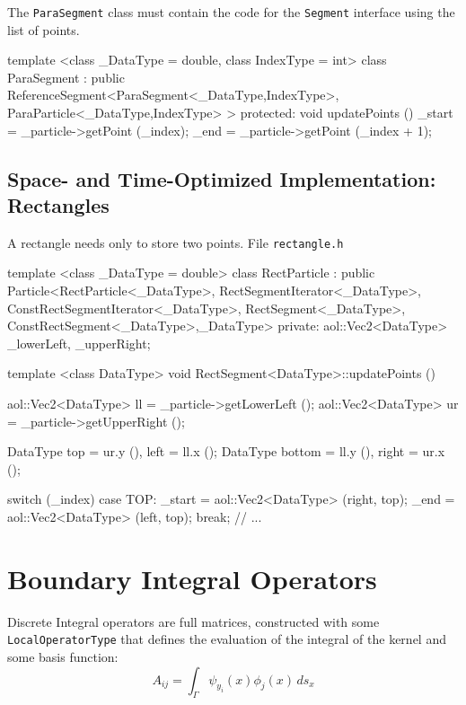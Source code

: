 The \lstinline$ParaSegment$ class must contain the code for the
\lstinline$Segment$ interface using the list of points.

\begin{myverbatim}
template <class _DataType = double, class IndexType = int>
  class ParaSegment
  : public ReferenceSegment<ParaSegment<_DataType,IndexType>,
   ParaParticle<_DataType,IndexType> > {
  protected:
    void updatePoints ()
    {
      _start = _particle->getPoint (_index);
      _end = _particle->getPoint (_index + 1);
    }
}
\end{myverbatim}

\subsection {Space- and Time-Optimized Implementation: Rectangles}

A rectangle needs only to store two points. File \lstinline$rectangle.h$

\begin{myverbatim}
template <class _DataType = double>
  class RectParticle
  : public Particle<RectParticle<_DataType>,
   RectSegmentIterator<_DataType>,
   ConstRectSegmentIterator<_DataType>,
   RectSegment<_DataType>,
   ConstRectSegment<_DataType>,_DataType> {
  private:
    aol::Vec2<DataType> _lowerLeft, _upperRight;
}
\end{myverbatim}



\begin{myverbatim}
template <class DataType>
void RectSegment<DataType>::updatePoints () {
  aol::Vec2<DataType> ll = _particle->getLowerLeft ();
  aol::Vec2<DataType> ur = _particle->getUpperRight ();

  DataType top = ur.y (), left = ll.x ();
  DataType bottom = ll.y (), right = ur.x ();

  switch (_index) {
  case TOP:
    _start = aol::Vec2<DataType> (right, top);
    _end = aol::Vec2<DataType> (left, top);
    break;
  // ...
  }
}
\end{myverbatim}

\section {Boundary Integral Operators}

Discrete Integral operators are full matrices, constructed with some\\
\lstinline$LocalOperatorType$
that defines the evaluation of the integral of the kernel and some basis function:
\[ A_{ij} = \int_\Gamma \psi_{y_i} (x) \phi_j (x) \, ds_x \]

